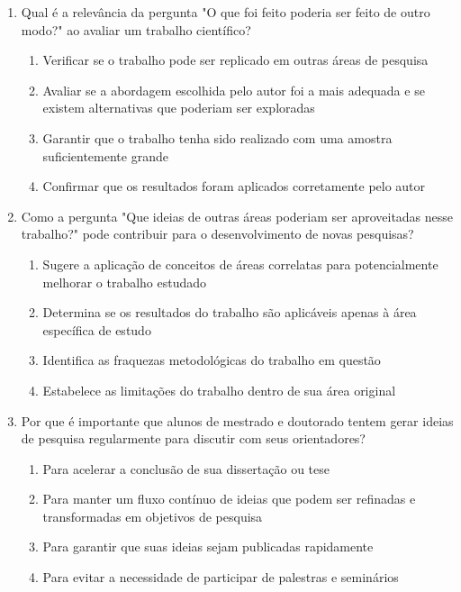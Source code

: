 \documentclass{article}
\begin{document}
\begin{enumerate}
\item Qual é a relevância da pergunta "O que foi feito poderia ser feito de outro modo?" ao avaliar um trabalho científico?
\begin{enumerate}
\item Verificar se o trabalho pode ser replicado em outras áreas de pesquisa
\item Avaliar se a abordagem escolhida pelo autor foi a mais adequada e se existem alternativas que poderiam ser exploradas
\item Garantir que o trabalho tenha sido realizado com uma amostra suficientemente grande
\item Confirmar que os resultados foram aplicados corretamente pelo autor
\end{enumerate}

\item Como a pergunta "Que ideias de outras áreas poderiam ser aproveitadas nesse trabalho?" pode contribuir para o desenvolvimento de novas pesquisas?
\begin{enumerate}
\item Sugere a aplicação de conceitos de áreas correlatas para potencialmente melhorar o trabalho estudado
\item Determina se os resultados do trabalho são aplicáveis apenas à área específica de estudo
\item Identifica as fraquezas metodológicas do trabalho em questão
\item Estabelece as limitações do trabalho dentro de sua área original
\end{enumerate}

\item Por que é importante que alunos de mestrado e doutorado tentem gerar ideias de pesquisa regularmente para discutir com seus orientadores?
\begin{enumerate}
\item Para acelerar a conclusão de sua dissertação ou tese
\item Para manter um fluxo contínuo de ideias que podem ser refinadas e transformadas em objetivos de pesquisa
\item Para garantir que suas ideias sejam publicadas rapidamente
\item Para evitar a necessidade de participar de palestras e seminários
\end{enumerate}

\pagebreak


\end{enumerate}
\end{document}
